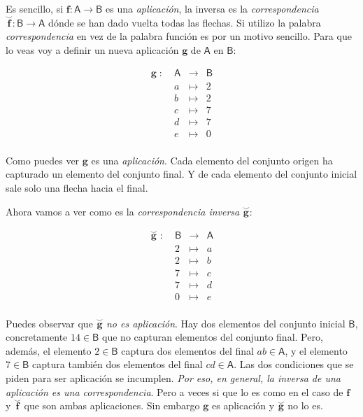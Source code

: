 \documentclass{amsart}
\theoremstyle{definition}
\theoremstyle{remark}
\numberwithin{equation}{section}
\newcommand{\fromto}{\longrightarrow}
\newcommand{\setsymbol}[1]{\textsf{#1}}
\newcommand{\sA}{\setsymbol{A}}
\newcommand{\sB}{\setsymbol{B}}
\newcommand{\monrel}[1]{\mathbf{#1}}
\newcommand{\monrelinv}[1]{\overset{\smallsmile}{\monrel{#1}}}
\newcommand{\funct}[1]{\monrel{#1}}
\begin{document}
	
	Es sencillo, si $\funct{f} : \sA \fromto \sB$ es una \emph{aplicación}, 
la inversa es la \emph{correspondencia} ${\monrelinv{f}} : \sB \fromto \sA$ 
dónde se han dado vuelta todas las flechas. Si utilizo la palabra 
\emph{correspondencia} en vez de la palabra función es por un motivo 
sencillo. Para que lo veas voy a definir un nueva aplicación $\funct{g}$ de 
$\sA$ en $\sB$:
	
	
	$$
	\begin{matrix}
		\funct{g}\; :\;   & \sA & \fromto & \sB \\
		{}  & a & \mapsto & 2 \\
		{}  & b & \mapsto & 2 \\
		{}  & c & \mapsto & 7 \\
		{}  & d & \mapsto & 7 \\
		{}  & e & \mapsto & 0 \\
	\end{matrix}
	$$
	
	
	Como puedes ver $\funct{g}$ es una \emph{aplicación}. Cada elemento del 
conjunto origen ha capturado un elemento del conjunto final. Y de cada 
elemento del conjunto inicial sale solo una flecha hacia el final.
	
	
	Ahora vamos a ver como es la \emph{correspondencia inversa} 
${\monrelinv{g}}$:
	
	
	$$
	\begin{matrix}
		{\monrelinv{g}}\; :\;   & \sB & \fromto & \sA \\
		{}  & 2 & \mapsto & a \\
		{}  & 2 & \mapsto & b \\
		{}  & 7 & \mapsto & c \\
		{}  & 7 & \mapsto & d \\
		{}  & 0 & \mapsto & e \\
	\end{matrix}
	$$
	
	
	Puedes observar que ${\monrelinv{g}}$ \emph{no es aplicación}. Hay dos 
elementos del conjunto inicial $\sB$, concretamente $1 4 \in \sB$ que no 
capturan elementos del conjunto final. Pero, además, el elemento $2 \in \sB$ 
captura dos elementos del final $a b \in \sA$, y el elemento $7 \in \sB$ 
captura también dos elementos del final $c d \in \sA$. Las dos condiciones 
que se piden para ser aplicación se incumplen. \emph{Por eso, en general, la 
inversa de una aplicación es una correspondencia}. Pero a veces si que lo es 
como en el caso de ${\funct{f}}$ y ${\monrelinv{f}}$ que son ambas 
aplicaciones. Sin embargo ${\funct{g}}$ es aplicación y ${\monrelinv{g}}$ no 
lo es.
	
\end{document}
